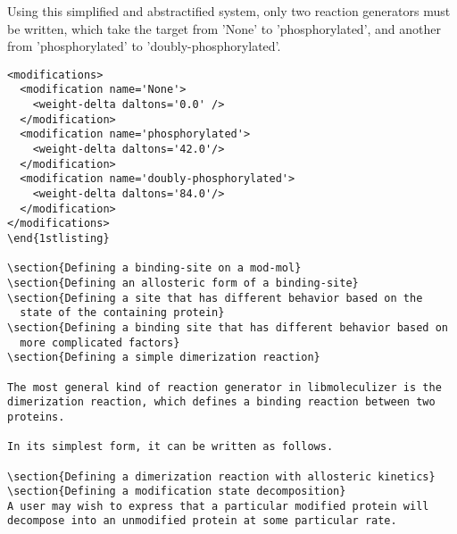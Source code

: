 Using this simplified and abstractified system, only two reaction
generators must be written, which take the target from 'None' to
'phosphorylated', and another from 'phosphorylated' to
'doubly-phosphorylated'.  

\begin{lstlisting}
<modifications>
  <modification name='None'>
    <weight-delta daltons='0.0' />
  </modification>
  <modification name='phosphorylated'>
    <weight-delta daltons='42.0'/>
  </modification>
  <modification name='doubly-phosphorylated'>
    <weight-delta daltons='84.0'/>
  </modification>
</modifications>
\end{1stlisting}

\section{Defining a binding-site on a mod-mol}
\section{Defining an allosteric form of a binding-site}
\section{Defining a site that has different behavior based on the
  state of the containing protein}
\section{Defining a binding site that has different behavior based on
  more complicated factors}
\section{Defining a simple dimerization reaction}

The most general kind of reaction generator in libmoleculizer is the
dimerization reaction, which defines a binding reaction between two
proteins.  

In its simplest form, it can be written as follows.  

\section{Defining a dimerization reaction with allosteric kinetics}
\section{Defining a modification state decomposition}
A user may wish to express that a particular modified protein will
decompose into an unmodified protein at some particular rate.


\end{lstlisting}
